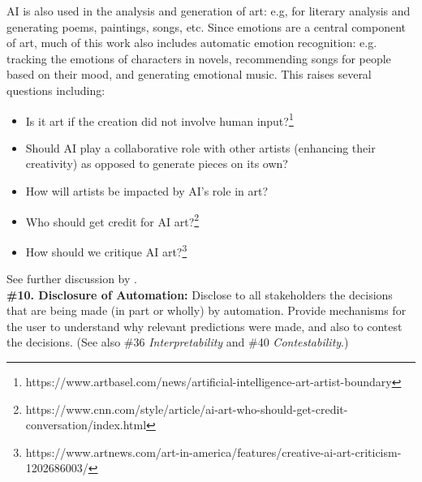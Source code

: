 \documentclass{clv3}
\begin{document}
AI is also used in the analysis and generation of art: e.g, for literary analysis and generating poems, paintings, songs, etc. Since emotions are a central component of art, much of this work also includes automatic emotion recognition: e.g. tracking the emotions of characters in novels, recommending songs for people based on their mood, and generating emotional music. This raises several questions including:\\[-20pt]
\begin{itemize}
    \item Is it art if the creation did not involve human input?\footnote{https://www.artbasel.com/news/artificial-intelligence-art-artist-boundary}
    \vspace*{-1mm}
    \item Should AI play a collaborative role with other artists (enhancing their creativity) as opposed to generate pieces on its own?
    \vspace*{-1mm}
    \item How will artists be impacted by AI’s role in art?
    \vspace*{-1mm}
    \item Who should get credit for AI art?\footnote{https://www.cnn.com/style/article/ai-art-who-should-get-credit-conversation/index.html}
    \vspace*{-1mm}
    \item     How should we critique AI art?\footnote{https://www.artnews.com/art-in-america/features/creative-ai-art-criticism-1202686003/}
\end{itemize}
\vspace*{-3mm}
\noindent See further discussion by \citet{hertzmann2020computers}.\\

\noindent \textbf{\#10. Disclosure of Automation:} Disclose to all stakeholders the decisions that are being made (in part or wholly) by automation. Provide mechanisms for the user to understand why relevant predictions were made, and also to contest the decisions. (See also \#36 \textit{Interpretability} and \#40 \textit{Contestability}.)
\end{document}
